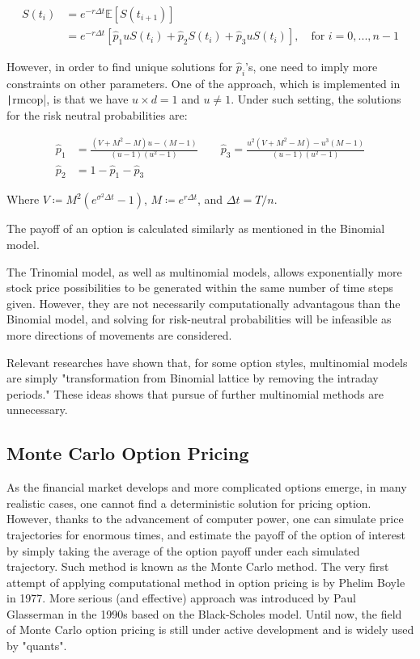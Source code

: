 \begin{align}
	S(t_{i}) &= e^{-r\Delta t}\mathbb{E}[S(t_{i+1})] \\
	&= e^{-r\Delta t}[\hat{p}_1uS(t_i)+\hat{p}_2S(t_i)+\hat{p}_3uS(t_i)],\quad\text{for }i=0,...,n-1
\end{align}

However, in order to find unique solutions for $\hat{p}_i$'s, one need to imply more constraints on other parameters. One of the approach, which is implemented in \texttt|rmcop|, is that we have $u\times d=1$ and $u\neq1$. Under such setting, the solutions for the risk neutral probabilities are:


\begin{align}
\hat{p}_1&=\frac{(V + M^2 - M) u - (M - 1)}{(u - 1)(u^2 - 1)}\qquad\hat{p}_3=\frac{u^2(V + M^2 - M) - u^3(M - 1)}{(u - 1)(u^2 - 1)} \\
\hat{p}_2&=1-\hat{p}_1-\hat{p}_3
\end{align}

Where $V\coloneqq M^2(e^{\sigma^2\Delta t} - 1)$, $M\coloneqq e^{r\Delta t}$, and $\Delta t=T/n$.

The payoff of an option is calculated similarly as mentioned in the Binomial model.

The Trinomial model, as well as multinomial models, allows exponentially more stock price possibilities to be generated within the same number of time steps given. However, they are not necessarily computationally advantagous than the Binomial model, and solving for risk-neutral probabilities will be infeasible as more directions of movements are considered.

Relevant researches\cite{SI2019} have shown that, for some option styles, multinomial models are simply "transformation from Binomial lattice by removing the intraday periods." These ideas shows that pursue of further multinomial methods are unnecessary.

\subsection{Monte Carlo Option Pricing}

As the financial market develops and more complicated options emerge, in many realistic cases, one cannot find a deterministic solution for pricing option. However, thanks to the advancement of computer power, one can simulate price trajectories for enormous times, and estimate the payoff of the option of interest by simply taking the average of the option payoff under each simulated trajectory. Such method is known as the Monte Carlo method. The very first attempt of applying computational method in option pricing is by Phelim Boyle in 1977. More serious (and effective) approach was introduced by Paul Glasserman \cite{Glasserman2003} in the 1990s based on the Black-Scholes model. Until now, the field of Monte Carlo option pricing is still under active development and is widely used by "quants".

